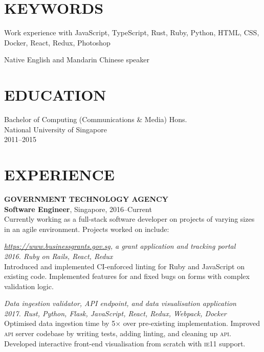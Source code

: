 \documentclass[line, margin]{res}
\makeatletter
\newcommand{\at}[0]{@}
\makeatother
\begin{document}
\address{
    \href{mailto:ng.guoyou+cv\at gmail.com}{ng.guoyou\at gmail.com}
    \href{https://github.com/gyng}{https://github.com/gyng}
}

\begin{resume}
    \section{KEYWORDS}
        Work experience with JavaScript, TypeScript, Rust, Ruby, Python, HTML, CSS, Docker, React, Redux, Photoshop

        Native English and Mandarin Chinese speaker

    \section{EDUCATION}
        Bachelor of Computing (Communications \& Media) Hons. \\
        National University of Singapore \\
        2011--2015

    \section{EXPERIENCE}
        \textbf{GOVERNMENT TECHNOLOGY AGENCY} \\
        \textbf{Software Engineer}, Singapore, 2016--Current \\
        Currently working as a full-stack software developer on projects of varying sizes in an agile environment. Projects worked on include:

        \textit{\href{https://www.businessgrants.gov.sg/}{https://www.businessgrants.gov.sg}, a grant application and tracking portal} \\
        \textit{2016. Ruby on Rails, React, Redux} \\
        Introduced and implemented CI-enforced linting for Ruby and JavaScript on existing code.
        Implemented features for and fixed bugs on forms with complex validation logic.

        \textit{Data ingestion validator, API endpoint, and data visualisation application} \\
        \textit{2017. Rust, Python, Flask, JavaScript, React, Redux, Webpack, Docker} \\
        Optimised data ingestion time by 5$\times$ over pre-existing implementation.
        Improved \textsc{api} server codebase by writing tests, adding linting, and cleaning up \textsc{api}.
        Developed interactive front-end visualisation from scratch with \textsc{ie11} support.


\end{resume}
\end{document}
